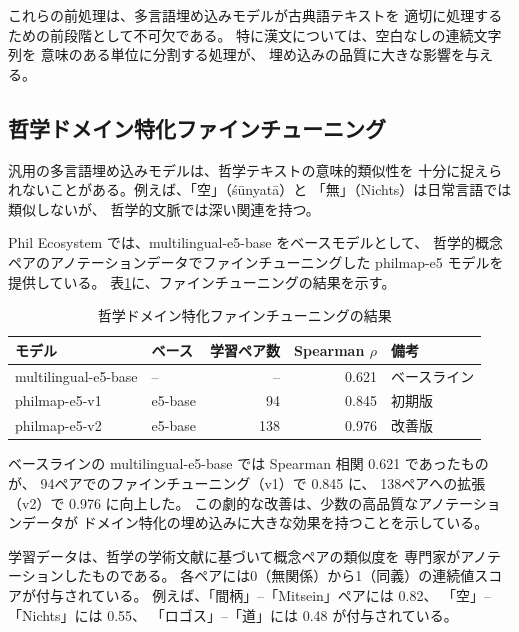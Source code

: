 \documentclass[a4paper,11pt]{ltjsarticle}
\begin{document}
これらの前処理は、多言語埋め込みモデルが古典語テキストを
適切に処理するための前段階として不可欠である。
特に漢文については、空白なしの連続文字列を
意味のある単位に分割する処理が、
埋め込みの品質に大きな影響を与える。

\subsection{哲学ドメイン特化ファインチューニング}

汎用の多言語埋め込みモデルは、哲学テキストの意味的類似性を
十分に捉えられないことがある。例えば、「空」（śūnyatā）と
「無」（Nichts）は日常言語では類似しないが、
哲学的文脈では深い関連を持つ。

Phil Ecosystem では、multilingual-e5-base\cite{wang2022e5} をベースモデルとして、
哲学的概念ペアのアノテーションデータでファインチューニングした
philmap-e5 モデルを提供している。
表\ref{tab:finetuning}に、ファインチューニングの結果を示す。

\begin{table}[H]
\centering
\caption{哲学ドメイン特化ファインチューニングの結果}
\label{tab:finetuning}
\small
\begin{tabular}{llrrl}
\toprule
\textbf{モデル} & \textbf{ベース} & \textbf{学習ペア数} & \textbf{Spearman $\rho$} & \textbf{備考} \\
\midrule
multilingual-e5-base & -- & -- & 0.621 & ベースライン \\
philmap-e5-v1 & e5-base & 94 & 0.845 & 初期版 \\
philmap-e5-v2 & e5-base & 138 & 0.976 & 改善版 \\
\bottomrule
\end{tabular}
\end{table}

ベースラインの multilingual-e5-base では Spearman 相関 0.621 であったものが、
94ペアでのファインチューニング（v1）で 0.845 に、
138ペアへの拡張（v2）で 0.976 に向上した。
この劇的な改善は、少数の高品質なアノテーションデータが
ドメイン特化の埋め込みに大きな効果を持つことを示している。

学習データは、哲学の学術文献に基づいて概念ペアの類似度を
専門家がアノテーションしたものである。
各ペアには0（無関係）から1（同義）の連続値スコアが付与されている。
例えば、「間柄」--「Mitsein」ペアには 0.82、
「空」--「Nichts」には 0.55、
「ロゴス」--「道」には 0.48 が付与されている。


\end{document}
